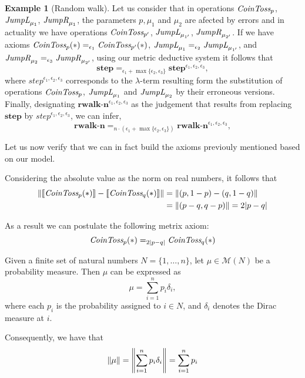 \documentclass[10pt,a4paper]{amsart}
\theoremstyle{definition}
\theoremstyle{definition}
\newtheorem{example}[definition]{Example}
\theoremstyle{definition}
\theoremstyle{definition}
\theoremstyle{definition}
\theoremstyle{definition}
\begin{document}
\begin{example}[Random walk]
    Let us consider that in operations $\emph{CoinToss}_p$, $\emph{JumpL}_{\mu_1}$, $\emph{JumpR}_{\mu_1}$, the parameters $p, \mu_1$ and $\mu_2$ are afected by errors and in actuality we have operations $\emph{CoinToss}_{p'}$, $\emph{JumpL}_{\mu_{1'}}$, $\emph{JumpR}_{\mu_{2'}}$. 
    If we have axioms 
    $\emph{CoinToss}_p (*) =_{\epsilon_1}\emph{CoinToss}_{p'}(*)$, 
    $\emph{JumpL}_{\mu_1} =_{\epsilon_2}\emph{JumpL}_{\mu_{1'}}$, and $\emph{JumpR}_{\mu_2} =_{\epsilon_3}\emph{JumpR}_{\mu_{2'}}$, using our metric deductive system it follows that 
    $$\textbf{step} =_{\epsilon_1 + \max\{\epsilon_2, \epsilon_3\}} \textbf{step}^{\epsilon_1, \epsilon_2, \epsilon_3},$$
    where ${step}^{\epsilon_1, \epsilon_2, \epsilon_3}$ corresponds to the $\lambda$-term resulting form the substitution of operations $\emph{CoinToss}_p$, $\emph{JumpL}_{\mu_1}$ and $\emph{JumpL}_{\mu_2}$ by their erroneous versions. 
    Finally, designating $\textbf{rwalk-n}^{\epsilon_1, \epsilon_2, \epsilon_3}$ as the judgement that results from replacing $\textbf{step}$ by ${step}^{\epsilon_1, \epsilon_2, \epsilon_3}$, we can infer,
    $$\textbf{rwalk-n} =_{n \cdot (\epsilon_1 + \max\{\epsilon_2, \epsilon_3\})} \textbf{rwalk-n}^{\epsilon_1, \epsilon_2, \epsilon_3},$$

      


    Let us now verify that we can in fact build the axioms previouly mentioned based on our model.



  Considering the absolute value as the norm on real numbers, it follows that
  \begin{align*}
    \left\lVert \left \llbracket \emph{CoinToss}_p(*) \right \rrbracket - \left \llbracket \emph{CoinToss}_q(*) \right \rrbracket \right\rVert & = \left\lVert (p,1-p) - (q, 1-q) \right\rVert \\
    & =\left\lVert (p-q,q-p) \right\rVert  = 2|p-q|
  \end{align*}

  As a result we can postulate the following metrix axiom:
  $$ \emph{CoinToss}_p(*) =_{2|p-q|} \emph{CoinToss}_q(*)$$


  Given a finite set of natural numbers \(N = \{1, \ldots, n\}\), let \(\mu \in \mathcal{M}(N)\) be a probability measure. Then \(\mu\) can be expressed as
  \[
  \mu = \sum_{i=1}^{n} p_i \delta_i,
  \]
  where each \(p_i\) is the probability assigned to \(i \in N\), and \(\delta_i\) denotes the Dirac measure at \(i\).

    Consequently, we have that 
    $$ \left\lVert \mu \right\rVert =  \left\lVert \sum_{i=1}^{n} p_i \delta_i \right\rVert = \sum_{i=1}^{n} p_i$$


\end{example}
\end{document}
